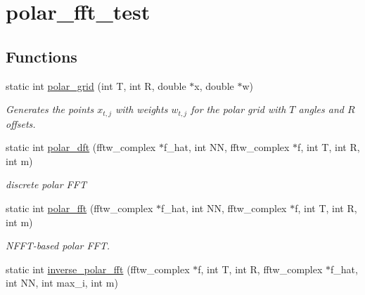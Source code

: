 \hypertarget{group__applications__polarFFT__polar}{
\section{polar\_\-fft\_\-test}
\label{group__applications__polarFFT__polar}
}
\subsection*{Functions}
\begin{CompactItemize}
\item 
static int \hyperlink{group__applications__polarFFT__polar_g307b67b4c00a1c756f140c7fa831cdae}{polar\_\-grid} (int T, int R, double $\ast$x, double $\ast$w)
\begin{CompactList}\small\item\em Generates the points $x_{t,j}$ with weights $w_{t,j}$ for the polar grid with $T$ angles and $R$ offsets. \item\end{CompactList}\item 
\hypertarget{group__applications__polarFFT__polar_gf6ec0d6bb5bfea4829e551c9dc9a656e}{
static int \hyperlink{group__applications__polarFFT__polar_gf6ec0d6bb5bfea4829e551c9dc9a656e}{polar\_\-dft} (fftw\_\-complex $\ast$f\_\-hat, int NN, fftw\_\-complex $\ast$f, int T, int R, int m)}
\label{group__applications__polarFFT__polar_gf6ec0d6bb5bfea4829e551c9dc9a656e}

\begin{CompactList}\small\item\em discrete polar FFT \item\end{CompactList}\item 
\hypertarget{group__applications__polarFFT__polar_g72ebda23ef48b6509833eea9a24fa839}{
static int \hyperlink{group__applications__polarFFT__polar_g72ebda23ef48b6509833eea9a24fa839}{polar\_\-fft} (fftw\_\-complex $\ast$f\_\-hat, int NN, fftw\_\-complex $\ast$f, int T, int R, int m)}
\label{group__applications__polarFFT__polar_g72ebda23ef48b6509833eea9a24fa839}

\begin{CompactList}\small\item\em NFFT-based polar FFT. \item\end{CompactList}\item 
\hypertarget{group__applications__polarFFT__polar_gd996d429207cf198e9027618e081ada0}{
static int \hyperlink{group__applications__polarFFT__polar_gd996d429207cf198e9027618e081ada0}{inverse\_\-polar\_\-fft} (fftw\_\-complex $\ast$f, int T, int R, fftw\_\-complex $\ast$f\_\-hat, int NN, int max\_\-i, int m)}
\label{group__applications__polarFFT__polar_gd996d429207cf198e9027618e081ada0}


\end{CompactItemize}
